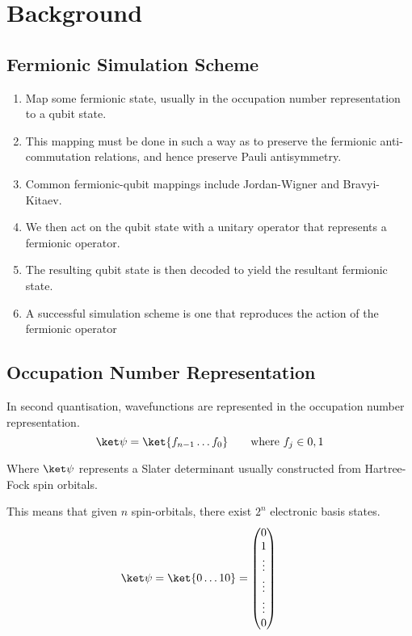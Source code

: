 \chapter{\label{background}Background}

\section{Fermionic Simulation Scheme}

\begin{enumerate}
    \item Map some fermionic state, usually in the occupation number representation to a qubit state.
    \item This mapping must be done in such a way as to preserve the fermionic anti-commutation relations, and hence preserve Pauli antisymmetry.
    \item Common fermionic-qubit mappings include Jordan-Wigner and Bravyi-Kitaev.
    \item We then act on the qubit state with a unitary operator that represents a fermionic operator.
    \item The resulting qubit state is then decoded to yield the resultant fermionic state.
    \item A successful simulation scheme is one that reproduces the action of the fermionic operator
\end{enumerate}

\section{Occupation Number Representation}
In second quantisation, wavefunctions are represented in the occupation number representation.
\begin{equation*}
    \ket\psi = \ket{f_{n-1} \dots f_{0}} \qquad \text{where } f_{j} \in {0, 1}
\end{equation*}

Where $\ket\psi$ represents a Slater determinant usually constructed from Hartree-Fock spin orbitals.

This means that given $n$ spin-orbitals, there exist $2^n$ electronic basis states.
\begin{equation*}
    \ket\psi = \ket{0 \dots 10} =
    \begin{pmatrix} 0 \\ 1 \\ \vdots \\ \vdots \\ \vdots \\ 0 \end{pmatrix} \qquad
\end{equation*}


